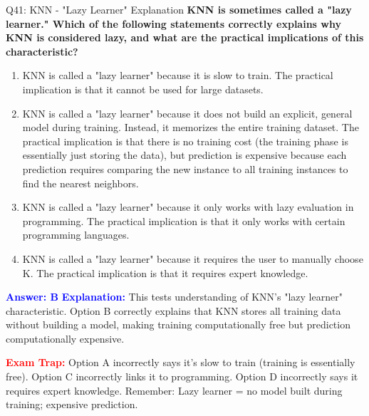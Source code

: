 \documentclass[8pt]{beamer}
\begin{document}
	\begin{frame}{Q41: KNN - "Lazy Learner" Explanation}
		\fontsize{6.5}{7.5}\selectfont
		\textbf{KNN is sometimes called a "lazy learner." Which of the following statements correctly explains why KNN is considered lazy, and what are the practical implications of this characteristic?}
		
		\begin{enumerate}
			\item KNN is called a "lazy learner" because it is slow to train. The practical implication is that it cannot be used for large datasets.
			\item KNN is called a "lazy learner" because it does not build an explicit, general model during training. Instead, it memorizes the entire training dataset. The practical implication is that there is no training cost (the training phase is essentially just storing the data), but prediction is expensive because each prediction requires comparing the new instance to all training instances to find the nearest neighbors.
			\item KNN is called a "lazy learner" because it only works with lazy evaluation in programming. The practical implication is that it only works with certain programming languages.
			\item KNN is called a "lazy learner" because it requires the user to manually choose K. The practical implication is that it requires expert knowledge.
		\end{enumerate}
		
		\vspace{0.1cm}
		\textcolor{blue}{\textbf{Answer: B}}
		\vspace{0.1cm}
		\textcolor{blue}{\textbf{Explanation:}} This tests understanding of KNN's "lazy learner" characteristic. Option B correctly explains that KNN stores all training data without building a model, making training computationally free but prediction computationally expensive.
		
		\textcolor{red}{\textbf{Exam Trap:}} Option A incorrectly says it's slow to train (training is essentially free). Option C incorrectly links it to programming. Option D incorrectly says it requires expert knowledge. Remember: Lazy learner = no model built during training; expensive prediction.
	\end{frame}
	
\end{document}
